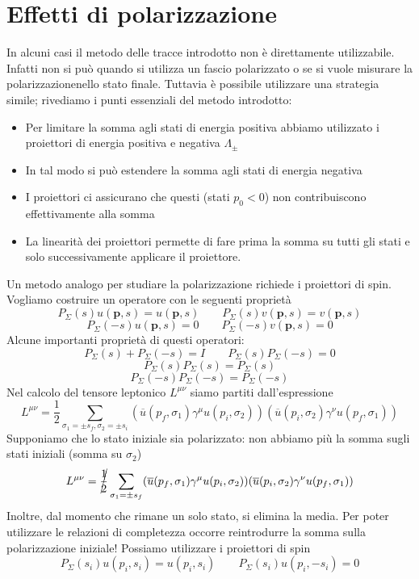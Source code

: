\section{Effetti di polarizzazione}
In alcuni casi il metodo delle tracce introdotto non è direttamente utilizzabile. Infatti non si può quando si utilizza un fascio polarizzato o se si vuole misurare la polarizzazionenello stato finale. Tuttavia è possibile utilizzare una strategia simile; rivediamo i punti essenziali del metodo introdotto:
\begin{itemize}
    \item Per limitare la somma agli stati di energia positiva abbiamo utilizzato i proiettori di energia positiva e negativa $\Lambda_{\pm}$
    \item In tal modo si può estendere la somma agli stati di energia negativa
    \item I proiettori ci assicurano che questi (stati $p_0<0$) non contribuiscono effettivamente alla somma
    \item La linearità dei proiettori permette di fare prima la somma su tutti gli stati e solo successivamente applicare il proiettore.
\end{itemize}
Un metodo analogo per studiare la polarizzazione richiede i proiettori di spin. Vogliamo costruire un operatore con le seguenti proprietà
$$
P_\Sigma(s) u(\mathbf{p}, s) = u(\mathbf{p}, s) \qquad P_\Sigma(s) v(\mathbf{p}, s) = v(\mathbf{p}, s)
$$
$$
P_\Sigma(-s) u(\mathbf{p}, s) = 0 \qquad P_\Sigma(-s) v(\mathbf{p}, s) = 0
$$
Alcune importanti proprietà di questi operatori:
$$
P_\Sigma(s) + P_\Sigma(-s) = I \qquad P_\Sigma(s) P_\Sigma(-s) = 0
$$
$$
P_\Sigma(s) P_\Sigma(s) = P_\Sigma(s)
$$
$$
P_\Sigma(-s) P_\Sigma(-s) = P_\Sigma(-s)
$$
Nel calcolo del tensore leptonico $L^{\mu\nu}$ siamo partiti dall'espressione
$$
L^{\mu\nu} = \frac{1}{2} \sum_{\sigma_1=\pm s_f, \sigma_2=\pm s_i} (\overline{u}(p_f, \sigma_1)\gamma^\mu u(p_i, \sigma_2))(\overline{u}(p_i, \sigma_2)\gamma^\nu u(p_f, \sigma_1))
$$
Supponiamo che lo stato iniziale sia polarizzato: non abbiamo più la somma sugli stati iniziali (somma su $\sigma_2$)
$$
L^{\mu\nu} = \cancel{\frac{1}{2}}\sum_{\sigma_1=\pm s_f} (\overline{u}(p_f, \sigma_1)\gamma^\mu u(p_i, \sigma_2))(\overline{u}(p_i, \sigma_2)\gamma^\nu u(p_f, \sigma_1))
$$
Inoltre, dal momento che rimane un solo stato, si elimina la media. Per poter utilizzare le relazioni di completezza occorre reintrodurre la somma sulla polarizzazione iniziale! Possiamo utilizzare i proiettori di spin
$$
P_\Sigma(s_i) u(p_i, s_i) = u(p_i, s_i) \qquad P_\Sigma(s_i) u(p_i, -s_i) = 0
$$
